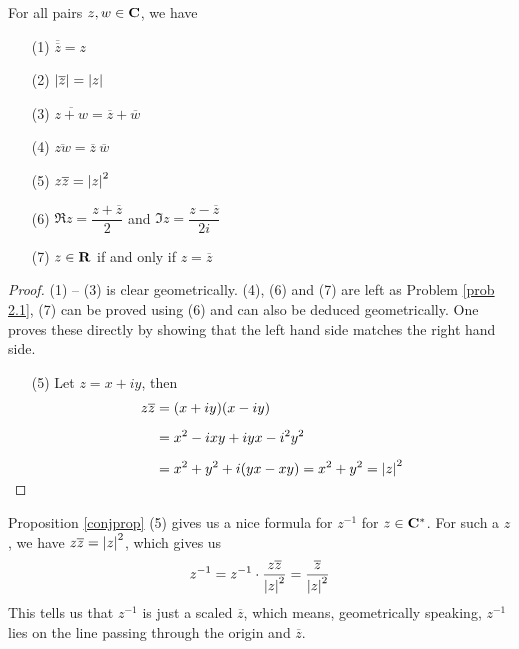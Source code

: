 \medskip

\begin{proposition}\label{conjprop}
For all pairs $z,w \in \mathbf C$, we have
\begin{itemize}
\item[(1)] $\overline{\overline{z}} = z$
\item[(2)] $\left\lvert\overline{z}\right\rvert = \left\lvert z\right\rvert$
\item[(3)] $\overline{z + w} = \overline{z} + \overline{w}$
\item[(4)] $\overline{zw} = \overline{z}\ \overline{w}$
\item[(5)] $z\overline{z} = \left\lvert z\right\rvert^2$
\item[(6)] $\Re z = \dfrac{z + \overline{z}}{2}$ and $\Im z = \dfrac{z - \overline{z}}{2i}$
\item[(7)] $z \in \mathbf R$ if and only if $z = \overline{z}$
\end{itemize}
\end{proposition}
\begin{proof}
(1) -- (3) is clear geometrically. (4), (6) and (7) are left as Problem \ref{prob 2.1}, (7) can be proved using (6) and can also be deduced geometrically. One proves these directly by showing that the left hand side matches the right hand side.
\begin{itemize}
\item[(5)] Let $z = x + iy$, then
\begin{align*}
z\overline{z} &= (x + iy)(x - iy)\\[0.5em]
&= x^2 - ixy + iyx - i^2y^2\\[0.5em]
&= x^2 + y^2 + i(yx - xy) = x^2 + y^2 = \left\lvert z\right\rvert^2\\[-1em]
\end{align*}
\end{itemize}
\vspace*{-\baselineskip}
\end{proof}

\medskip

\begin{discussion}
Proposition \ref{conjprop} (5) gives us a nice formula for $z^{-1}$ for $z\in \mathbf C^*$. For such a $z$, we have $z\overline{z} = \left\lvert z\right\rvert^2$, which gives us
\[z^{-1} = z^{-1}\cdot \frac{z\overline{z}}{\left\lvert z\right\rvert^2} = \frac{\overline{z}}{\left\lvert z\right\rvert^2}\]
This tells us that $z^{-1}$ is just a scaled $\overline{z}$, which means, geometrically speaking, $z^{-1}$ lies on the line passing through the origin and $\overline{z}$.
\end{discussion}

